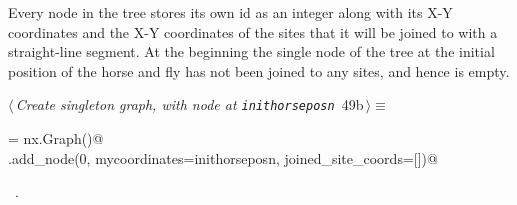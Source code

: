 \documentclass[11.5pt]{report}
\begin{document}
\vspace{-0.8cm} \newchunk Every node in the tree stores its own id as an integer along with 
its X-Y coordinates and the X-Y coordinates of the sites that it will be joined to with a 
straight-line segment. At the beginning the single node of the tree at the initial position
of the horse and fly has not been joined to any sites, and hence is empty. 

\begin{flushleft} \small
\begin{minipage}{\linewidth}\label{scrap75}\raggedright\small
{} $\langle\,${\itshape Create singleton graph, with node at \verb|inithorseposn|}\nobreak\ {\footnotesize {49b}}$\,\rangle\equiv$
\vspace{-1ex}
\begin{list}{}{} \item
\mbox{}\verb@G = nx.Graph()@\\
\mbox{}\verb@G.add_node(0, mycoordinates=inithorseposn, joined_site_coords=[])@\\
\mbox{}\verb@@{\NWsep}
\end{list}
\vspace{-1.5ex}
\footnotesize
\begin{list}{}{\setlength{\itemsep}{-\parsep}\setlength{\itemindent}{-\leftmargin}}
\item \NWtxtMacroRefIn\ .

\item{}
\end{list}
\end{minipage}\vspace{4ex}
\end{flushleft}
\end{document}
